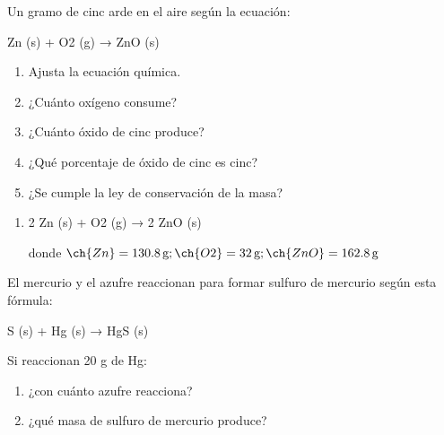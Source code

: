\begin{exercise}
    Un gramo de cinc arde en el aire según la ecuación:
    \begin{reaction*}
        Zn (s) + O2 (g) → ZnO (s)
    \end{reaction*}
    \begin{enumerate}[label=\letraminuscula]
        \item Ajusta la ecuación química.
        \item ¿Cuánto oxígeno consume?
        \item ¿Cuánto óxido de cinc produce?
        \item ¿Qué porcentaje de óxido de cinc es cinc?
        \item ¿Se cumple la ley de conservación de la masa?
    \end{enumerate}
    \begin{solu}
        \begin{enumerate}[label=\letraminuscula]
            \item \begin{reaction*}
                      2 Zn (s) + O2 (g) → 2 ZnO (s)
            \end{reaction*}
            donde \( \ch{Zn} = \qty{130.8}{\g}; \ch{O2} = \qty{32}{\g}; \ch{ZnO} = \qty{162.8}{\g} \)
        \end{enumerate}
    \end{solu}
\end{exercise}

\begin{exercise}
    El mercurio y el azufre reaccionan para formar sulfuro de mercurio según esta fórmula:
    \begin{reaction*}
        S (s) + Hg (s) → HgS (s)
    \end{reaction*}
    Si reaccionan 20 g de Hg:
    \begin{enumerate}[label=\letraminuscula]
        \item ¿con cuánto azufre reacciona?
        \item ¿qué masa de sulfuro de mercurio
        produce?
    \end{enumerate}
    \begin{solu}

    \end{solu}
\end{exercise}

